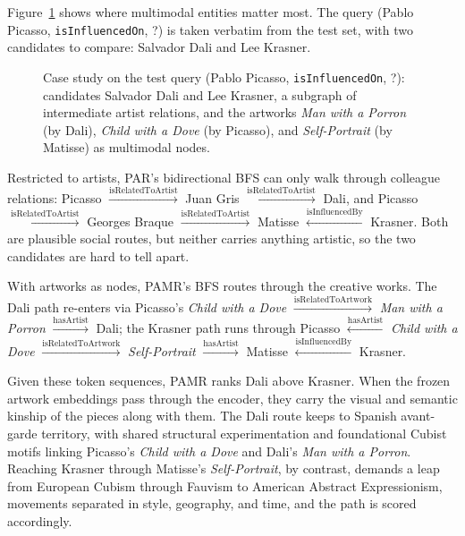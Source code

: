\documentclass[runningheads]{llncs}
\begin{document}
Figure~\ref{fig:case-study} shows where multimodal entities matter
most. The query (Pablo Picasso, \texttt{isInfluencedOn}, ?) is taken
verbatim from the test set, with two candidates to compare: Salvador
Dali and Lee Krasner.

\begin{figure}[t]
  \centering
  
  \caption{Case study on the test query (Pablo Picasso,
    \texttt{isInfluencedOn}, ?): candidates Salvador Dali and
    Lee Krasner, a subgraph of intermediate artist relations, and
    the artworks \textit{Man with a Porron} (by Dali),
    \textit{Child with a Dove} (by Picasso), and \textit{Self-Portrait}
    (by Matisse) as multimodal nodes.}
  \label{fig:case-study}
\end{figure}

Restricted to artists, PAR's bidirectional BFS can only walk through colleague relations: Picasso $\xrightarrow{\text{isRelatedToArtist}}$ Juan Gris $\xrightarrow{\text{isRelatedToArtist}}$ Dali, and Picasso $\xrightarrow{\text{isRelatedToArtist}}$ Georges Braque $\xrightarrow{\text{isRelatedToArtist}}$ Matisse $\xleftarrow{\text{isInfluencedBy}}$ Krasner. Both are plausible social routes, but neither carries anything artistic, so the two candidates are hard to tell apart.

With artworks as nodes, PAMR's BFS routes through the creative works. The Dali path re-enters via Picasso's \textit{Child with a Dove} $\xrightarrow{\text{isRelatedToArtwork}}$ \textit{Man with a Porron} $\xrightarrow{\text{hasArtist}}$ Dali; the Krasner path runs through Picasso $\xleftarrow{\text{hasArtist}}$ \textit{Child with a Dove} $\xrightarrow{\text{isRelatedToArtwork}}$ \textit{Self-Portrait} $\xrightarrow{\text{hasArtist}}$ Matisse $\xleftarrow{\text{isInfluencedBy}}$ Krasner.

Given these token sequences, PAMR ranks Dali above Krasner. When the frozen artwork embeddings pass through the encoder, they carry the visual and semantic kinship of the pieces along with them. The Dali route keeps to Spanish avant-garde territory, with shared structural experimentation and foundational Cubist motifs linking Picasso's \textit{Child with a Dove} and Dali's \textit{Man with a Porron}. Reaching Krasner through Matisse's \textit{Self-Portrait}, by contrast, demands a leap from European Cubism through Fauvism to American Abstract Expressionism, movements separated in style, geography, and time, and the path is scored accordingly.
\end{document}
